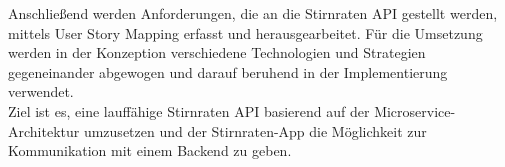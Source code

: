 Anschließend werden Anforderungen, die an die Stirnraten API gestellt werden, mittels User Story Mapping erfasst und herausgearbeitet. Für die Umsetzung werden in der Konzeption verschiedene Technologien und Strategien gegeneinander abgewogen und darauf beruhend in der Implementierung verwendet.\\ 

Ziel ist es, eine lauffähige Stirnraten API basierend auf der Microservice-Architektur umzusetzen und der Stirnraten-App die Möglichkeit zur Kommunikation mit einem Backend zu geben. \\
